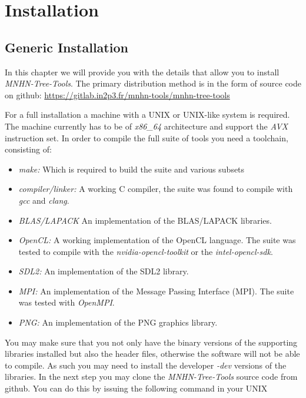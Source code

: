 \chapter{Installation}

\section{Generic Installation} \label{sec-inst-generic}

In this chapter we will provide you with the details that allow you to
install \emph{MNHN-Tree-Tools}. The primary distribution method is in the
form of source code on github: \newline
\url{https://gitlab.in2p3.fr/mnhn-tools/mnhn-tree-tools} \newline

For a full installation a machine with a UNIX or UNIX-like system
is required. The machine currently has to be of \emph{x86\_64}
architecture and support the \emph{AVX} instruction set. In order to
compile the full suite of tools you need a toolchain, consisting of:
\begin{itemize}
\item \emph{make:} Which is required to build the suite and various subsets
\item \emph{compiler/linker:} A working C compiler, the suite was found to
  compile with \emph{gcc} and \emph{clang}.
\item \emph{BLAS/LAPACK} An implementation of the BLAS/LAPACK
  libraries.
\item \emph{OpenCL:} A working implementation of the OpenCL
  language. The suite was tested to compile with the
  \emph{nvidia-opencl-toolkit} or the \emph{intel-opencl-sdk}.
\item \emph{SDL2:} An implementation of the SDL2 library.
\item \emph{MPI:} An implementation of the Message Passing Interface
  (MPI). The suite was tested with \emph{OpenMPI}.
\item \emph{PNG:} An implementation of the PNG graphics library.
\end{itemize}
You may make sure that you not only have the binary versions of the
supporting libraries installed but also the header files, otherwise
the software will not be able to compile. As such you may need to
install the developer \emph{-dev} versions of the libraries. In the
next step you may clone the \emph{MNHN-Tree-Tools} source code from github.
You can do this by issuing the following command in your UNIX
